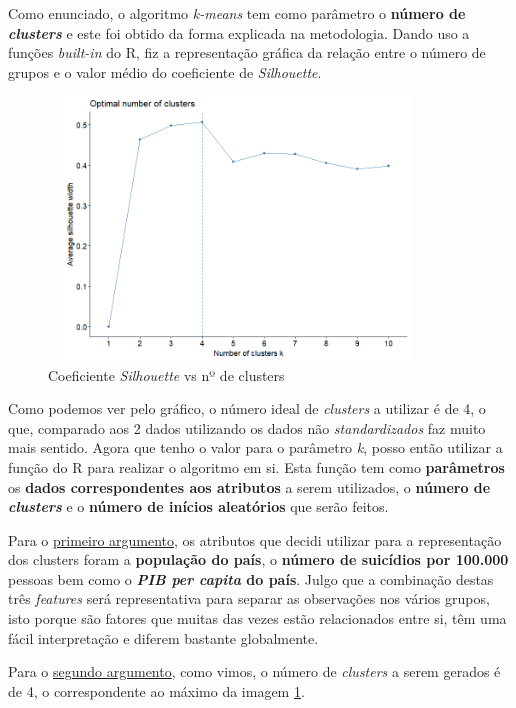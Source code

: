 \documentclass[a4paper,12pt]{article}
\begin{document}
Como enunciado, o algoritmo \textit{k-means} tem como parâmetro o \textbf{número de \textit{clusters}} e este foi obtido da forma explicada na metodologia. Dando uso a funções \textit{built-in} do R, fiz a representação gráfica da relação entre o número de grupos e o valor médio do coeficiente de \textit{Silhouette}. 


\begin{center} %
	\begin{figure}[H]
		\centering
		\includegraphics[width=10cm, height=7cm]{clusteringSilhouetteComStandardizacao.png}
		\caption{Coeficiente \textit{Silhouette} vs nº de clusters}
		\label{fig:silhouette}
	\end{figure}
\end{center}


Como podemos ver pelo gráfico, o número ideal de \textit{clusters} a utilizar é de 4, o que, comparado aos 2 dados utilizando os dados não \textit{standardizados} faz muito mais sentido.
Agora que tenho o valor para o parâmetro \textit{k}, posso então utilizar a função do R para realizar o algoritmo em si. Esta função tem como \textbf{parâmetros} os \textbf{dados correspondentes aos atributos} a serem utilizados, o \textbf{número de \textit{clusters}} e o \textbf{número de inícios aleatórios} que serão feitos. 


Para o \underline{primeiro argumento}, os atributos que decidi utilizar para a representação dos clusters foram a \textbf{população do país}, o \textbf{número de suicídios por 100.000} pessoas bem como o \textbf{\textit{PIB per capita} do país}. Julgo que a combinação destas três \textit{features} será representativa para separar as observações nos vários grupos, isto porque são fatores que muitas das vezes estão relacionados entre si, têm uma fácil interpretação e diferem bastante globalmente.


Para o \underline{segundo argumento}, como vimos, o número de \textit{clusters} a serem gerados é de 4, o correspondente ao máximo da imagem \ref{fig:silhouette}.
\end{document}
